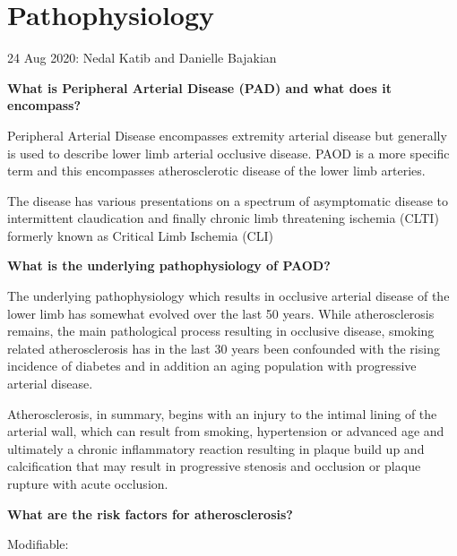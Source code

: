 \documentclass[
]{book}
\begin{document}
\hypertarget{pathophysiology}{%
\section{Pathophysiology}\label{pathophysiology}}

24 Aug 2020: Nedal Katib and Danielle Bajakian

\textbf{What is Peripheral Arterial Disease (PAD) and what does it
encompass?}

Peripheral Arterial Disease encompasses extremity arterial disease but
generally is used to describe lower limb arterial occlusive disease.
PAOD is a more specific term and this encompasses atherosclerotic
disease of the lower limb arteries.

The disease has various presentations on a spectrum of asymptomatic
disease to intermittent claudication and finally chronic limb
threatening ischemia (CLTI) formerly known as Critical Limb Ischemia
(CLI) \citep{aboyans2017ESCGuidelines2018}

\textbf{What is the underlying pathophysiology of PAOD?}

The underlying pathophysiology which results in occlusive arterial
disease of the lower limb has somewhat evolved over the last 50 years.
While atherosclerosis remains, the main pathological process resulting
in occlusive disease, smoking related atherosclerosis has in the last 30
years been confounded with the rising incidence of diabetes and in
addition an aging population with progressive arterial disease.

Atherosclerosis, in summary, begins with an injury to the intimal lining
of the arterial wall, which can result from smoking, hypertension or
advanced age and ultimately a chronic inflammatory reaction resulting in
plaque build up and calcification that may result in progressive
stenosis and occlusion or plaque rupture with acute occlusion.

\textbf{What are the risk factors for atherosclerosis?}

Modifiable:
\end{document}
